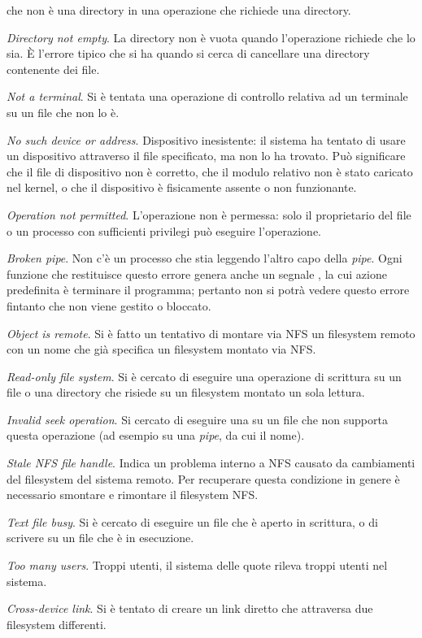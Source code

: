 \begin{basedescript}{\desclabelwidth{1.5cm}\desclabelstyle{\nextlinelabel}}
  che non è una directory in una operazione che richiede una directory.
\item[\errcode{ENOTEMPTY} \textit{Directory not empty}.] La directory non è
  vuota quando l'operazione richiede che lo sia. È l'errore tipico che si ha
  quando si cerca di cancellare una directory contenente dei file.
\item[\errcode{ENOTTY} \textit{Not a terminal}.] Si è tentata una operazione
  di controllo relativa ad un terminale su un file che non lo è.
\item[\errcode{ENXIO} \textit{No such device or address}.] Dispositivo
  inesistente: il sistema ha tentato di usare un dispositivo attraverso il
  file specificato, ma non lo ha trovato. Può significare che il file di
  dispositivo non è corretto, che il modulo relativo non è stato caricato nel
  kernel, o che il dispositivo è fisicamente assente o non funzionante.
\item[\errcode{EPERM} \textit{Operation not permitted}.] L'operazione non è
  permessa: solo il proprietario del file o un processo con sufficienti
  privilegi può eseguire l'operazione.
\item[\errcode{EPIPE} \textit{Broken pipe}.] Non c'è un processo che stia
  leggendo l'altro capo della \textit{pipe}. Ogni funzione che restituisce
  questo errore genera anche un segnale , la cui azione
  predefinita è terminare il programma; pertanto non si potrà vedere questo
  errore fintanto che  non viene gestito o bloccato.
\item[\errcode{EREMOTE} \textit{Object is remote}.] Si è fatto un tentativo di
  montare via NFS un filesystem remoto con un nome  che già specifica un
  filesystem montato via NFS. 
\item[\errcode{EROFS} \textit{Read-only file system}.]  Si è cercato di
  eseguire una operazione di scrittura su un file o una directory che risiede
  su un filesystem montato un sola lettura.
\item[\errcode{ESPIPE} \textit{Invalid seek operation}.] Si cercato di
  eseguire una  su un file che non supporta questa operazione (ad
  esempio su una \textit{pipe}, da cui il nome).
\item[\errcode{ESTALE} \textit{Stale NFS file handle}.] Indica un problema
  interno a NFS causato da cambiamenti del filesystem del sistema remoto. Per
  recuperare questa condizione in genere è necessario smontare e rimontare il
  filesystem NFS.
\item[\errcode{ETXTBSY} \textit{Text file busy}.] Si è cercato di eseguire un
  file che è aperto in scrittura, o di scrivere su un file che è in
  esecuzione.
\item[\errcode{EUSERS} \textit{Too many users}.] Troppi utenti, il sistema delle
  quote rileva troppi utenti nel sistema.
\item[\errcode{EXDEV} \textit{Cross-device link}.] Si è tentato di creare un
  link diretto che attraversa due filesystem differenti.
\end{basedescript}

